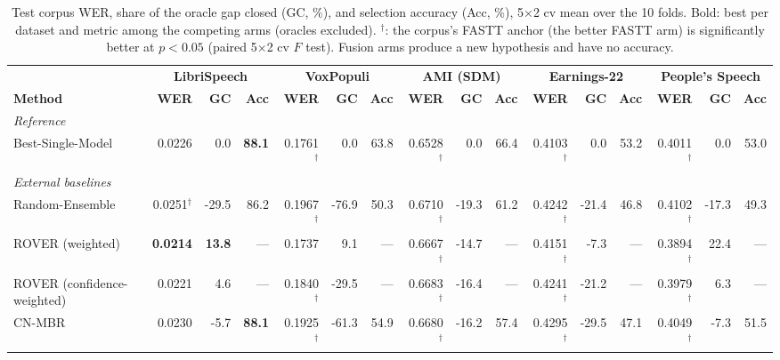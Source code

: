 \begin{table}[t]
    \centering
    \caption{Test corpus WER, share of the oracle gap closed (GC, \%), and selection accuracy (Acc, \%), 5$\times$2 cv mean over the 10 folds. Bold: best per dataset and metric among the competing arms (oracles excluded). $^{\dagger}$: the corpus's FASTT anchor (the better FASTT arm) is significantly better at $p<0.05$ (paired 5$\times$2 cv $F$ test). Fusion arms produce a new hypothesis and have no accuracy.}
    \label{tab:main_merged} \footnotesize \setlength{\tabcolsep}{3pt}
    \begin{adjustbox}{max width=\linewidth}
    \begin{tabular}{lrrrrrrrrrrrrrrr}
        \toprule
         & \multicolumn{3}{c}{\textbf{LibriSpeech}} & \multicolumn{3}{c}{\textbf{VoxPopuli}} & \multicolumn{3}{c}{\textbf{AMI (SDM)}} & \multicolumn{3}{c}{\textbf{Earnings-22}} & \multicolumn{3}{c}{\textbf{People's Speech}} \\ \cmidrule(lr){2-4} \cmidrule(lr){5-7} \cmidrule(lr){8-10} \cmidrule(lr){11-13} \cmidrule(lr){14-16}
    \textbf{Method} & \textbf{WER} & \textbf{GC} & \textbf{Acc} & \textbf{WER} & \textbf{GC} & \textbf{Acc} & \textbf{WER} & \textbf{GC} & \textbf{Acc} & \textbf{WER} & \textbf{GC} & \textbf{Acc} & \textbf{WER} & \textbf{GC} & \textbf{Acc} \\
        \midrule
        \multicolumn{16}{l}{\textit{Reference}} \\
        Best-Single-Model & 0.0226 & 0.0 & \textbf{88.1} & 0.1761$^{\dagger}$ & 0.0 & 63.8 & 0.6528$^{\dagger}$ & 0.0 & 66.4 & 0.4103$^{\dagger}$ & 0.0 & 53.2 & 0.4011$^{\dagger}$ & 0.0 & 53.0 \\
        \midrule \multicolumn{16}{l}{\textit{External baselines}} \\
        Random-Ensemble & 0.0251$^{\dagger}$ & -29.5 & 86.2 & 0.1967$^{\dagger}$ & -76.9 & 50.3 & 0.6710$^{\dagger}$ & -19.3 & 61.2 & 0.4242$^{\dagger}$ & -21.4 & 46.8 & 0.4102$^{\dagger}$ & -17.3 & 49.3 \\
        ROVER (weighted) & \textbf{0.0214} & \textbf{13.8} & --- & 0.1737 & 9.1 & --- & 0.6667$^{\dagger}$ & -14.7 & --- & 0.4151$^{\dagger}$ & -7.3 & --- & 0.3894$^{\dagger}$ & 22.4 & --- \\
        ROVER (confidence-weighted) & 0.0221 & 4.6 & --- & 0.1840$^{\dagger}$ & -29.5 & --- & 0.6683$^{\dagger}$ & -16.4 & --- & 0.4241$^{\dagger}$ & -21.2 & --- & 0.3979$^{\dagger}$ & 6.3 & --- \\
        CN-MBR & 0.0230 & -5.7 & \textbf{88.1} & 0.1925$^{\dagger}$ & -61.3 & 54.9 & 0.6680$^{\dagger}$ & -16.2 & 57.4 & 0.4295$^{\dagger}$ & -29.5 & 47.1 & 0.4049$^{\dagger}$ & -7.3 & 51.5 \\

\end{tabular}
\end{adjustbox}
\end{table}

